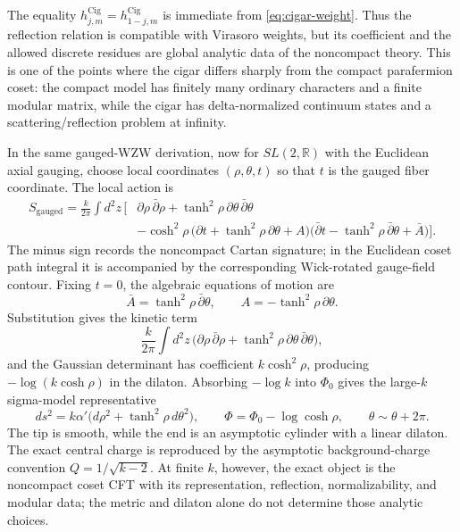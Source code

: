 The equality \(h^{\operatorname{Cig}}_{j,m}
=h^{\operatorname{Cig}}_{1-j,m}\) is immediate from
\eqref{eq:cigar-weight}.  Thus the reflection relation is compatible with
Virasoro weights, but its coefficient and the allowed discrete residues are
global analytic data of the noncompact theory.  This is one of the points
where the cigar differs sharply from the compact parafermion coset: the
compact model has finitely many ordinary characters and a finite modular
matrix, while the cigar has delta-normalized continuum states and a
scattering/reflection problem at infinity.

\begin{controlledapproximation}
\label{capprox:cigar-large-level-background}
In the same gauged-WZW derivation, now for \(SL(2,\mathbb R)\) with the
Euclidean axial gauging, choose local coordinates \((\rho,\theta,t)\) so
that \(t\) is the gauged fiber coordinate.  The local action is
\begin{align}
  S_{\mathrm{gauged}}
  =
  \frac{k}{2\pi}
  \int d^2z\,\Big[
    &
    \partial\rho\,\bar\partial\rho
    +\tanh^2\rho\,\partial\theta\,\bar\partial\theta
    \nonumber\\
    &
    -\cosh^2\rho\,
    \bigl(\partial t+\tanh^2\rho\,\partial\theta+A\bigr)
    \bigl(\bar\partial t-\tanh^2\rho\,\bar\partial\theta+\bar A\bigr)
  \Big].
  \label{eq:sl2-gauged-wzw-local-action}
\end{align}
The minus sign records the noncompact Cartan signature; in the Euclidean
coset path integral it is accompanied by the corresponding Wick-rotated
gauge-field contour.  Fixing \(t=0\), the algebraic equations of motion are
\[
  \bar A=\tanh^2\rho\,\bar\partial\theta,
  \qquad
  A=-\tanh^2\rho\,\partial\theta .
\]
Substitution gives the kinetic term
\[
  \frac{k}{2\pi}
  \int d^2z\,
  \bigl(
    \partial\rho\,\bar\partial\rho
    +\tanh^2\rho\,\partial\theta\,\bar\partial\theta
  \bigr),
\]
and the Gaussian determinant has coefficient \(k\cosh^2\rho\), producing
\(-\log(k\cosh\rho)\) in the dilaton.  Absorbing \(-\log k\) into
\(\Phi_0\) gives the large-\(k\) sigma-model representative
\begin{equation}
  ds^2
  =
  k\alpha'\bigl(d\rho^2+\tanh^2\rho\,d\theta^2\bigr),
  \qquad
  \Phi
  =
  \Phi_0-\log\cosh\rho,
  \qquad
  \theta\sim\theta+2\pi .
  \label{eq:cigar-background}
\end{equation}
The tip is smooth, while the end is an asymptotic cylinder with a linear
dilaton.  The exact central charge is reproduced by the asymptotic
background-charge convention \(Q=1/\sqrt{k-2}\).  At finite \(k\), however,
the exact object is the noncompact coset CFT with its representation,
reflection, normalizability, and modular data; the metric and dilaton alone
do not determine those analytic choices.
\end{controlledapproximation}

